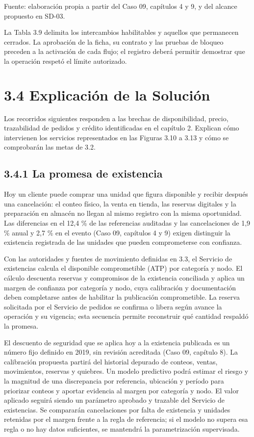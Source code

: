 \documentclass[11pt]{article}
\begin{document}
{Fuente: elaboración propia a partir del Caso 09, capítulos 4 y 9, y del alcance propuesto en SD-03.}

{La Tabla 3.9 delimita los intercambios habilitables y aquellos que permanecen cerrados. La aprobación de la ficha, su contrato y las pruebas de bloqueo preceden a la activación de cada flujo; el registro deberá permitir demostrar que la operación respetó el límite autorizado.}


\section{3.4 Explicación de la Solución}

{Los recorridos siguientes responden a las brechas de disponibilidad, precio, trazabilidad de pedidos y crédito identificadas en el capítulo 2. Explican cómo intervienen los servicios representados en las Figuras 3.10 a 3.13 y cómo se comprobarán las metas de 3.2.}

\subsection{3.4.1 La promesa de existencia}

{Hoy un cliente puede comprar una unidad que figura disponible y recibir después una cancelación: el conteo físico, la venta en tienda, las reservas digitales y la preparación en almacén no llegan al mismo registro con la misma oportunidad. Las diferencias en el 12,4 \% de las referencias auditadas y las cancelaciones de 1,9 \% anual y 2,7 \% en el evento (Caso 09, capítulos 4 y 9) exigen distinguir la existencia registrada de las unidades que pueden comprometerse con confianza.}

{Con las autoridades y fuentes de movimiento definidas en 3.3, el Servicio de existencias calcula el disponible comprometible (ATP) por categoría y nodo. El cálculo descuenta reservas y compromisos de la existencia conciliada y aplica un margen de confianza por categoría y nodo, cuya calibración y documentación deben completarse antes de habilitar la publicación comprometible. La reserva solicitada por el Servicio de pedidos se confirma o libera según avance la operación y su vigencia; esta secuencia permite reconstruir qué cantidad respaldó la promesa.}

{El descuento de seguridad que se aplica hoy a la existencia publicada es un número fijo definido en 2019, sin revisión acreditada (Caso 09, capítulo 8). La calibración propuesta partirá del historial depurado de conteos, ventas, movimientos, reservas y quiebres. Un modelo predictivo podrá estimar el riesgo y la magnitud de una discrepancia por referencia, ubicación y período para priorizar conteos y aportar evidencia al margen por categoría y nodo. El valor aplicado seguirá siendo un parámetro aprobado y trazable del Servicio de existencias. Se compararán cancelaciones por falta de existencia y unidades retenidas por el margen frente a la regla de referencia; si el modelo no supera esa regla o no hay datos suficientes, se mantendrá la parametrización supervisada.}
\end{document}
